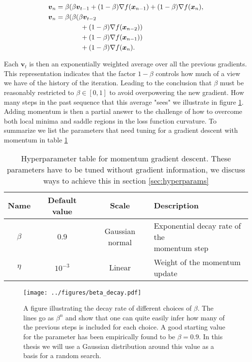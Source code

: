 \begin{align*}
\boldsymbol{v}_n &= \beta(\beta \boldsymbol{v}_{t-1} + (1-\beta)\nabla f(\boldsymbol{x}_{n-1})+ (1-\beta)\nabla f(\boldsymbol{x}_{n}), \\
\boldsymbol{v}_n &= \beta(\beta (\beta \boldsymbol{v}_{t-2} \\& \hspace{0.5in}+ (1-\beta)\nabla f(\boldsymbol{x}_{n-2})) \\
& \hspace{0.5in}+ (1-\beta)\nabla f(\boldsymbol{x}_{n-1})) \\
& \hspace{0.5in}+ (1-\beta)\nabla f(\boldsymbol{x}_{n}).
\end{align*}

\noindent Each $\boldsymbol{v}_t$ is then an exponentially weighted average over all the previous gradients. This representation indicates that the factor $1-\beta$ controls how much of a view we have of the history of the iteration. Leading to the conclusion that $\beta$ must be reasonably restricted to $\beta \in [0, 1]$ to avoid overpowering the new gradient. How many steps in the past sequence that this average "sees" we illustrate in figure \ref{fig:beta}. Adding momentum is then a partial answer to the challenge of how to overcome both local minima and saddle regions in the loss function curvature. To summarize we list the parameters that need tuning for a gradient descent with momentum in table \ref{tab:momentum}

\begin{table}
\centering
\caption{Hyperparameter table for momentum gradient descent. These parameters have to be tuned without gradient information, we discuss ways to achieve this in section \ref{sec:hyperparams}}\label{tab:momentum}
\begin{tabular}{cccl}
\toprule
Name &Default value & Scale  & Description\\
\midrule
$\beta$  & $0.9$ & Gaussian normal & \makecell[l]{ Exponential decay rate of the \\ momentum step}\\
$\eta$  & $10^{-3}$ & Linear & \makecell[l]{ Weight of the momentum \\ update} \\
\bottomrule
\end{tabular}
\end{table}


\begin{figure}
\centering
\texttt{[image: ../figures/beta\_decay.pdf]}
\caption[Exponential decay in momentum gradient descent]{A figure illustrating the decay rate of different choices of $\beta$. The lines go as $\beta^n$ and show that one can quite easily infer how many of the previous steps is included for each choice. A good starting value for the parameter has been empirically found to be $\beta=0.9$. In this thesis we will use a Gaussian distribution around this value as a basis for a random search.}\label{fig:beta}
\end{figure}

